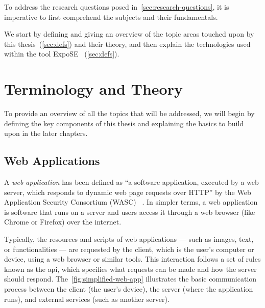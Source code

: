 To address the research questions posed in~\autoref{sec:research-questions}, it is imperative to first comprehend the subjects and their fundamentals. 

We start by defining  and giving an overview of the topic areas touched upon by this thesis~(\autoref{sec:defs}) and their theory,  and then explain the technologies used within the tool ExpoSE ~(\autoref{sec:defs}).

\section{Terminology and Theory}
\label{sec:defs}
To provide an overview of all the topics that will be addressed, we will begin by defining the key components of this thesis and explaining the basics to build upon in the later chapters. 

\subsection{Web Applications}
\label{sec:webapp}
A \textit{web application} has been defined as “a software application, executed by a web server, which responds to dynamic web page requests over HTTP” by the Web Application Security Consortium (WASC) ~\cite{noauthor_web_2012}. 
In simpler terms, a web application is software that runs on a server and users access it through a web browser (like Chrome or Firefox) over the internet.

Typically, the resources and scripts of web applications — such as images, text, or functionalities — are requested by the client, which is the user's computer or device, using a web browser or similar tools. This interaction follows a set of rules known as the \gls{api}, which specifies what requests can be made and how the server should respond.
The~\autoref{fig:simplified-web-app} illustrates the basic communication process between the client (the user's device), the server (where the application runs), and external services (such as another server).

